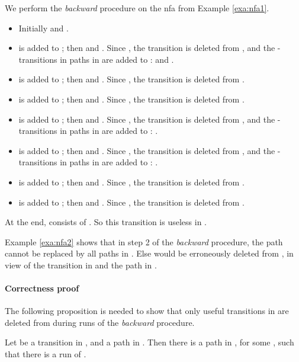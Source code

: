 \documentclass{llncs}
\begin{document}
\begin{example}
\label{exa:nfa2}
We perform the {\em backward} procedure on the nfa  from Example \ref{exa:nfa1}.
\begin{itemize}
\item
Initially  and .\vspace{2mm}
\item
 is added to ; then  and .
Since , the transition  is deleted from ,
and the -transitions in paths  in  are added to :
 and .\vspace{2mm}
\item
 is added to ; then  and . Since , the transition  is deleted from .\vspace{2mm}
\item
 is added to ; then  and . Since , the transition  is deleted from .\vspace{2mm}
\item
 is added to ; then  and .
Since , the transition  is deleted from ,
and the -transitions in paths  in  are added to : .\vspace{2mm}
\item
 is added to ; then  and .
Since , the transition  is deleted from ,
and the -transitions in paths  in  are added to : .\vspace{2mm}
\item
 is added to ; then  and . Since , the transition  is deleted from .\vspace{2mm}
\item
 is added to ; then  and . Since , the transition  is deleted from .
\end{itemize}
At the end,  consists of . So this transition is useless in .
\end{example}

Example \ref{exa:nfa2} shows that in step 2 of the {\em backward} procedure,
the path  cannot be replaced by all paths  in .
Else  would be erroneously deleted from , in view of
the transition  in  and
the path  in .

\paragraph{Correctness proof}
The following proposition is needed to show that only useful transitions in  are deleted from  during runs
of the {\em backward} procedure.

\vspace*{-2mm}

\begin{proposition}
\label{prop:nfa2}
Let  be a transition in , and  a path in .
Then there is a path  in , for some , such that
there is a run  of .
\end{proposition}
\end{document}
